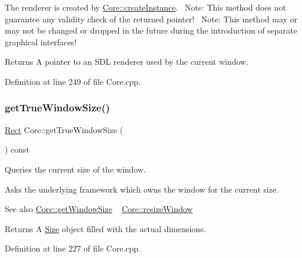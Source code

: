 The renderer is created by \hyperlink{classbkengine_1_1Core_a8b809ebbd1348ae9b59d49388e7a18f0}{Core\+::create\+Instance}.~\newline
Note\+: This method does not guarantee any validity check of the returned pointer!~\newline
Note\+: This method may or may not be changed or dropped in the future during the introduction of separate graphical interfaces!

\begin{DoxyReturn}{Returns}
A pointer to an S\+DL renderer used by the current window. 
\end{DoxyReturn}


Definition at line 249 of file Core.\+cpp.

\mbox{\label{classbkengine_1_1Core_a5238bcd142db1cb5a15cd3d6733a92da}} 
\subsubsection{\texorpdfstring{get\+True\+Window\+Size()}{getTrueWindowSize()}}
{\footnotesize\ttfamily \hyperlink{structbkengine_1_1Rect}{Rect} Core\+::get\+True\+Window\+Size (\begin{DoxyParamCaption}{ }\end{DoxyParamCaption}) const}



Queries the current size of the window. 

Asks the underlying framework which owns the window for the current size.

\begin{DoxySeeAlso}{See also}
\hyperlink{classbkengine_1_1Core_a92e101c1e579bd2bc7fee001de816d6f}{Core\+::get\+Window\+Size} ~\newline
 \hyperlink{classbkengine_1_1Core_a88b8c671689df472845515953b5b7b2d}{Core\+::resize\+Window} 
\end{DoxySeeAlso}
\begin{DoxyReturn}{Returns}
A \hyperlink{structbkengine_1_1Size}{Size} object filled with the actual dimensions. 
\end{DoxyReturn}


Definition at line 227 of file Core.\+cpp.

\mbox{\label{classbkengine_1_1Core_a9fa654f1b1391876dbf77349f979e106}} 

